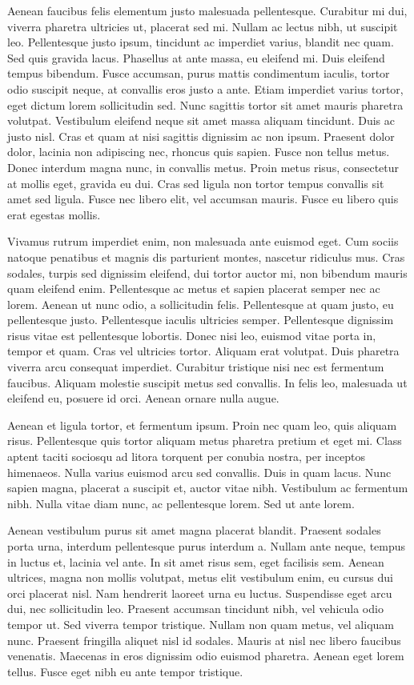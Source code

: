Aenean faucibus felis elementum justo malesuada pellentesque. Curabitur mi dui, viverra pharetra ultricies ut, placerat sed mi. Nullam ac lectus nibh, ut suscipit leo. Pellentesque justo ipsum, tincidunt ac imperdiet varius, blandit nec quam. Sed quis gravida lacus. Phasellus at ante massa, eu eleifend mi. Duis eleifend tempus bibendum. Fusce accumsan, purus mattis condimentum iaculis, tortor odio suscipit neque, at convallis eros justo a ante. Etiam imperdiet varius tortor, eget dictum lorem sollicitudin sed. Nunc sagittis tortor sit amet mauris pharetra volutpat. Vestibulum eleifend neque sit amet massa aliquam tincidunt. Duis ac justo nisl. Cras et quam at nisi sagittis dignissim ac non ipsum. Praesent dolor dolor, lacinia non adipiscing nec, rhoncus quis sapien. Fusce non tellus metus. Donec interdum magna nunc, in convallis metus. Proin metus risus, consectetur at mollis eget, gravida eu dui. Cras sed ligula non tortor tempus convallis sit amet sed ligula. Fusce nec libero elit, vel accumsan mauris. Fusce eu libero quis erat egestas mollis.

Vivamus rutrum imperdiet enim, non malesuada ante euismod eget. Cum sociis natoque penatibus et magnis dis parturient montes, nascetur ridiculus mus. Cras sodales, turpis sed dignissim eleifend, dui tortor auctor mi, non bibendum mauris quam eleifend enim. Pellentesque ac metus et sapien placerat semper nec ac lorem. Aenean ut nunc odio, a sollicitudin felis. Pellentesque at quam justo, eu pellentesque justo. Pellentesque iaculis ultricies semper. Pellentesque dignissim risus vitae est pellentesque lobortis. Donec nisi leo, euismod vitae porta in, tempor et quam. Cras vel ultricies tortor. Aliquam erat volutpat. Duis pharetra viverra arcu consequat imperdiet. Curabitur tristique nisi nec est fermentum faucibus. Aliquam molestie suscipit metus sed convallis. In felis leo, malesuada ut eleifend eu, posuere id orci. Aenean ornare nulla augue.

Aenean et ligula tortor, et fermentum ipsum. Proin nec quam leo, quis aliquam risus. Pellentesque quis tortor aliquam metus pharetra pretium et eget mi. Class aptent taciti sociosqu ad litora torquent per conubia nostra, per inceptos himenaeos. Nulla varius euismod arcu sed convallis. Duis in quam lacus. Nunc sapien magna, placerat a suscipit et, auctor vitae nibh. Vestibulum ac fermentum nibh. Nulla vitae diam nunc, ac pellentesque lorem. Sed ut ante lorem.

Aenean vestibulum purus sit amet magna placerat blandit. Praesent sodales porta urna, interdum pellentesque purus interdum a. Nullam ante neque, tempus in luctus et, lacinia vel ante. In sit amet risus sem, eget facilisis sem. Aenean ultrices, magna non mollis volutpat, metus elit vestibulum enim, eu cursus dui orci placerat nisl. Nam hendrerit laoreet urna eu luctus. Suspendisse eget arcu dui, nec sollicitudin leo. Praesent accumsan tincidunt nibh, vel vehicula odio tempor ut. Sed viverra tempor tristique. Nullam non quam metus, vel aliquam nunc. Praesent fringilla aliquet nisl id sodales. Mauris at nisl nec libero faucibus venenatis. Maecenas in eros dignissim odio euismod pharetra. Aenean eget lorem tellus. Fusce eget nibh eu ante tempor tristique.

